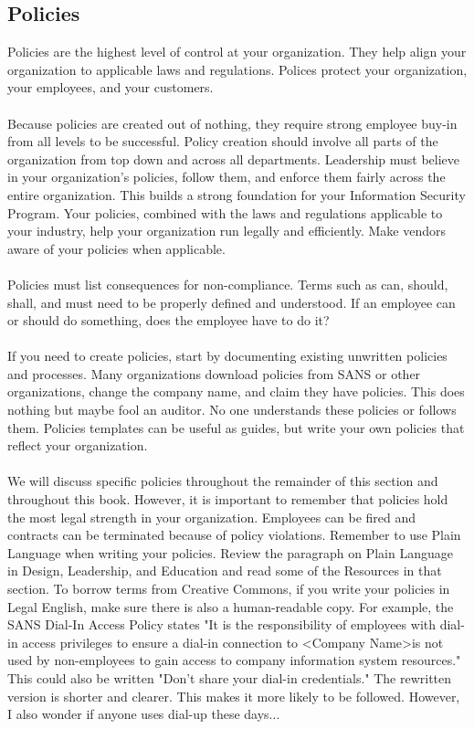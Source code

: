 \subsection{Policies}
Policies are the highest level of control at your organization. They help align your organization to applicable laws and regulations. Polices protect your organization, your employees, and your customers.\\\\
Because policies are created out of nothing, they require strong employee buy-in from all levels to be successful. Policy creation should involve all parts of the organization from top down and across all departments. Leadership must believe in your organization's policies, follow them, and enforce them fairly across the entire organization. This builds a strong foundation for your Information Security Program. Your policies, combined with the laws and regulations applicable to your industry, help your organization run legally and efficiently. Make vendors aware of your policies when applicable.\\\\
Policies must list consequences for non-compliance. Terms such as can, should, shall, and must need to be properly defined and understood. If an employee can or should do something, does the employee have to do it?\\\\
If you need to create policies, start by documenting existing unwritten policies and processes. Many organizations download policies from SANS or other organizations, change the company name, and claim they have policies. This does nothing but maybe fool an auditor. No one understands these policies or follows them. Policies templates can be useful as guides, but write your own policies that reflect your organization.\\\\
We will discuss specific policies throughout the remainder of this section and throughout this book. However, it is important to remember that policies hold the most legal strength in your organization. Employees can be fired and contracts can be terminated because of policy violations. Remember to use Plain Language when writing your policies. Review the paragraph on Plain Language in Design, Leadership, and Education and read some of the Resources in that section. To borrow terms from Creative Commons, if you write your policies in Legal English, make sure there is also a human-readable copy. For example, the SANS Dial-In Access Policy states "It is the responsibility of employees with dial-in access privileges to ensure a dial-in connection to \textless Company Name\textgreater  is not used by non-employees to gain access to company information system resources." This could also be written "Don't share your dial-in credentials." The rewritten version is shorter and clearer. This makes it more likely to be followed. However, I also wonder if anyone uses dial-up these days...
